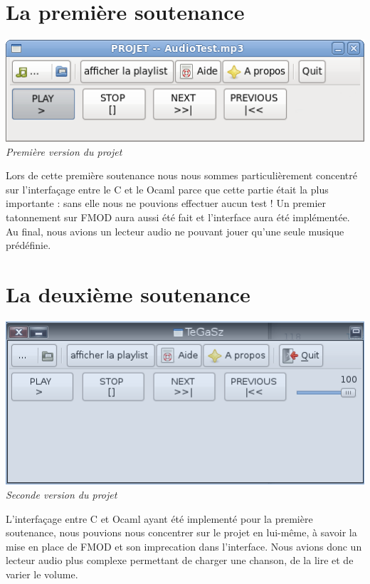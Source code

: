 \documentclass[12pt,a4paper]{report}
\begin{document}
\section{La première soutenance}

\begin{center}
\includegraphics[scale = 0.8]{interface1.png}
\it{Première version du projet}

\end{center}
Lors de cette première soutenance nous nous sommes particulièrement concentré sur l'interfaçage entre le C et le Ocaml parce que cette partie était la plus importante : sans elle nous ne pouvions effectuer aucun test !
Un premier tatonnement sur FMOD aura aussi été fait et l'interface aura été implémentée. 
Au final, nous avions un lecteur audio ne pouvant jouer qu'une seule musique prédéfinie.

\section{La deuxième soutenance}

\begin{center}
\includegraphics[scale = 0.8]{interface2.png}
\it{Seconde version du projet}
\end{center}


L'interfaçage entre C et Ocaml ayant été implementé pour la première soutenance,  nous pouvions nous concentrer sur le projet en lui-même, à savoir la mise en place de FMOD et son imprecation dans l'interface.
Nous avions donc un lecteur audio plus complexe permettant de charger une chanson, de la lire et de varier le volume.
\end{document}
